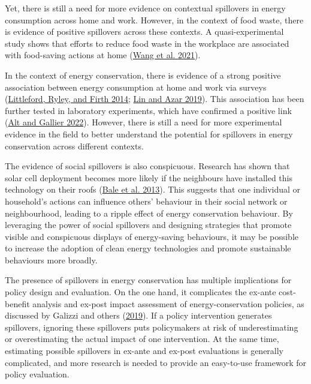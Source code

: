\documentclass[
  12pt,
  captions=heading]{scrreport}
\begin{document}
Yet, there is still a need for more evidence on contextual spillovers in
energy consumption across home and work. However, in the context of food
waste, there is evidence of positive spillovers across these contexts. A
quasi-experimental study shows that efforts to reduce food waste in the
workplace are associated with food-saving actions at home
(\protect\hyperlink{ref-wang2021take}{Wang et al. 2021}).

In the context of energy conservation, there is evidence of a strong
positive association between energy consumption at home and work via
surveys (\protect\hyperlink{ref-littleford2014context}{Littleford,
Ryley, and Firth 2014}; \protect\hyperlink{ref-lin2019mixing}{Lin and
Azar 2019}). This association has been further tested in laboratory
experiments, which have confirmed a positive link
(\protect\hyperlink{ref-alt2022incentives}{Alt and Gallier 2022}).
However, there is still a need for more experimental evidence in the
field to better understand the potential for spillovers in energy
conservation across different contexts.

The evidence of social spillovers is also conspicuous. Research has
shown that solar cell deployment becomes more likely if the neighbours
have installed this technology on their roofs
(\protect\hyperlink{ref-bale2013harnessing}{Bale et al. 2013}). This
suggests that one individual or household's actions can influence
others' behaviour in their social network or neighbourhood, leading to a
ripple effect of energy conservation behaviour. By leveraging the power
of social spillovers and designing strategies that promote visible and
conspicuous displays of energy-saving behaviours, it may be possible to
increase the adoption of clean energy technologies and promote
sustainable behaviours more broadly.

The presence of spillovers in energy conservation has multiple
implications for policy design and evaluation. On the one hand, it
complicates the ex-ante cost-benefit analysis and ex-post impact
assessment of energy-conservation policies, as discussed by Galizzi and
others (\protect\hyperlink{ref-galizzi2019measure}{2019}). If a policy
intervention generates spillovers, ignoring these spillovers puts
policymakers at risk of underestimating or overestimating the actual
impact of one intervention. At the same time, estimating possible
spillovers in ex-ante and ex-post evaluations is generally complicated,
and more research is needed to provide an easy-to-use framework for
policy evaluation.
\end{document}
